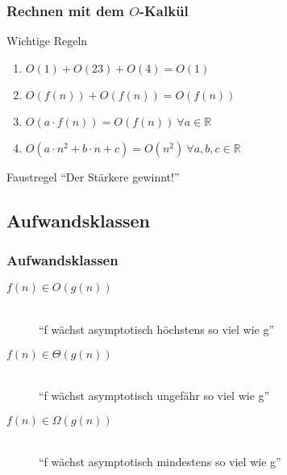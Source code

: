 \begin{frame}
  \frametitle{Rechnen mit dem $O$-Kalkül}
  \begin{block}{Wichtige Regeln}
    \begin{enumerate}
      \item $O(1) + O(23) + O(4) = O(1)$
      \item $O( f(n) ) + O( f(n) ) = O( f(n) )$
      \item $O( a\cdot f(n) ) = O(f(n)) \ \forall a\in\mathbb{R}$
      \item $O( a\cdot n^2+b\cdot n+c ) = O( n^2 ) \ \forall a,b,c\in\mathbb{R}$
    \end{enumerate}
  \end{block}
  \begin{alertblock}{Faustregel}
    "`Der Stärkere gewinnt!"'
  \end{alertblock}
\end{frame}

\subsection{Aufwandsklassen}

\begin{frame}
  \frametitle{Aufwandsklassen}
  \begin{description}
    \item[$f(n) \in O(g(n))$]  \hfill \\
      "`f wächst asymptotisch höchstens so viel wie g"'
    \item[$f(n) \in \Theta(g(n))$] \hfill \\
      "`f wächst asymptotisch ungefähr so viel wie g"'
    \item[$f(n) \in \Omega(g(n))$] \hfill \\
      "`f wächst asymptotisch mindestens so viel wie g"'
  \end{description}
\end{frame}

